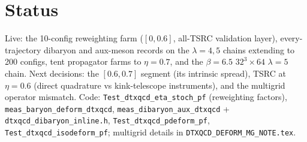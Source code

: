 \documentclass[11pt]{article}
\begin{document}
\section{Status}
Live: the 10-config reweighting farm ($[0,0.6]$, all-TSRC validation layer), every-trajectory
dibaryon and aux-meson records on the $\lambda=4,5$ chains extending to 200 configs, tent
propagator farms to $\eta=0.7$, and the $\beta=6.5$ $32^3\times64$ $\lambda=5$ chain.  Next
decisions: the $[0.6,0.7]$ segment (its intrinsic spread), TSRC at $\eta=0.6$ (direct
quadrature vs kink-telescope instruments), and the multigrid operator mismatch.
Code: \texttt{Test\_dtxqcd\_eta\_stoch\_pf} (reweighting factors),
\texttt{meas\_baryon\_deform\_dtxqcd}, \texttt{meas\_dibaryon\_aux\_dtxqcd} +
\texttt{dtxqcd\_dibaryon\_inline.h}, \texttt{Test\_dtxqcd\_pdeform\_pf},
\texttt{Test\_dtxqcd\_isodeform\_pf}; multigrid details in
\texttt{DTXQCD\_DEFORM\_MG\_NOTE.tex}.
\end{document}
